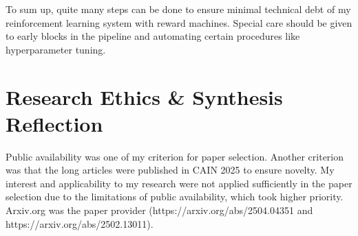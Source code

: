 \documentclass[a4paper,10pt]{article} %
\begin{document}
To sum up, quite many steps can be done to ensure minimal technical debt of my reinforcement learning system with reward machines.
Special care should be given to early blocks in the pipeline and automating certain procedures like hyperparameter tuning.

\section{Research Ethics \& Synthesis Reflection}

Public availability was one of my criterion for paper selection.
Another criterion was that the long articles were published in CAIN 2025 to ensure novelty.
My interest and applicability to my research were not applied sufficiently in the paper selection due to the limitations of public availability, which took higher priority.
Arxiv.org was the paper provider (https://arxiv.org/abs/2504.04351 and https://arxiv.org/abs/2502.13011).

\printbibliography
\end{document}
